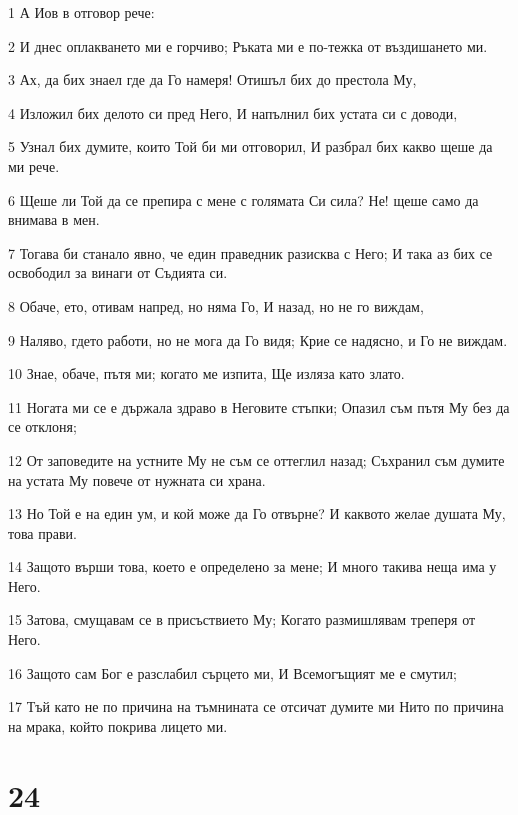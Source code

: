\par 1 А Иов в отговор рече:
\par 2 И днес оплакването ми е горчиво; Ръката ми е по-тежка от въздишането ми.
\par 3 Ах, да бих знаел где да Го намеря! Отишъл бих до престола Му,
\par 4 Изложил бих делото си пред Него, И напълнил бих устата си с доводи,
\par 5 Узнал бих думите, които Той би ми отговорил, И разбрал бих какво щеше да ми рече.
\par 6 Щеше ли Той да се препира с мене с голямата Си сила? Не! щеше само да внимава в мен.
\par 7 Тогава би станало явно, че един праведник разисква с Него; И така аз бих се освободил за винаги от Съдията си.
\par 8 Обаче, ето, отивам напред, но няма Го, И назад, но не го виждам,
\par 9 Наляво, гдето работи, но не мога да Го видя; Крие се надясно, и Го не виждам.
\par 10 Знае, обаче, пътя ми; когато ме изпита, Ще изляза като злато.
\par 11 Ногата ми се е държала здраво в Неговите стъпки; Опазил съм пътя Му без да се отклоня;
\par 12 От заповедите на устните Му не съм се оттеглил назад; Съхранил съм думите на устата Му повече от нужната си храна.
\par 13 Но Той е на един ум, и кой може да Го отвърне? И каквото желае душата Му, това прави.
\par 14 Защото върши това, което е определено за мене; И много такива неща има у Него.
\par 15 Затова, смущавам се в присъствието Му; Когато размишлявам треперя от Него.
\par 16 Защото сам Бог е разслабил сърцето ми, И Всемогъщият ме е смутил;
\par 17 Тъй като не по причина на тъмнината се отсичат думите ми Нито по причина на мрака, който покрива лицето ми.

\chapter{24}

